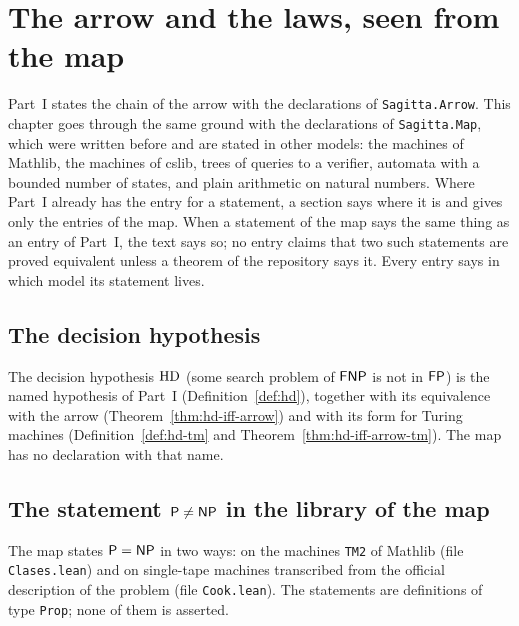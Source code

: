 \chapter{The arrow and the laws, seen from the map}
\label{chap:arrow}

Part~I states the chain of the arrow with the declarations of \texttt{Sagitta.Arrow}. This chapter
goes through the same ground with the declarations of \texttt{Sagitta.Map}, which were written
before and are stated in other models: the machines of Mathlib, the machines of cslib, trees of
queries to a verifier, automata with a bounded number of states, and plain arithmetic on natural
numbers. Where Part~I already has the entry for a statement, a section says where it is and gives
only the entries of the map. When a statement of the map says the same thing as an entry of
Part~I, the text says so; no entry claims that two such statements are proved equivalent unless a
theorem of the repository says it. Every entry says in which model its statement lives.

\section{The decision hypothesis}
\label{sec:arrow-hd}

The decision hypothesis $\mathrm{HD}$ (some search problem of $\mathsf{FNP}$ is not in $\mathsf{FP}$) is the named
hypothesis of Part~I (Definition~\ref{def:hd}), together with its equivalence with the arrow
(Theorem~\ref{thm:hd-iff-arrow}) and with its form for Turing machines (Definition~\ref{def:hd-tm}
and Theorem~\ref{thm:hd-iff-arrow-tm}). The map has no declaration with that name.

\section{The statement $\mathsf{P} \neq \mathsf{NP}$ in the library of the map}
\label{sec:arrow-p-ne-np}

The map states $\mathsf{P} = \mathsf{NP}$ in two ways: on the machines \texttt{TM2} of Mathlib (file
\texttt{Clases.lean}) and on single-tape machines transcribed from the official description of the
problem (file \texttt{Cook.lean}). The statements are definitions of type \texttt{Prop}; none of
them is asserted.

